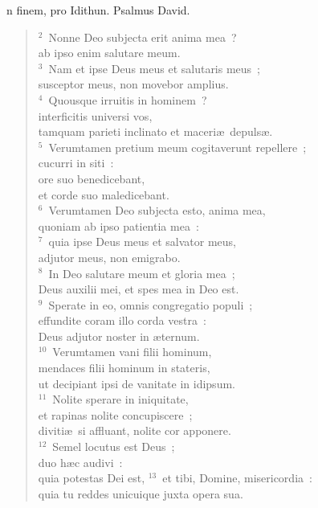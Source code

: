\bchapter
{}n finem, pro Idithun. Psalmus David.
\begin{flushleft}\begin{verse}\vspace{6pt}${}^{2}$~Nonne Deo subjecta erit anima mea~?\\ ab ipso enim salutare meum.\\
${}^{3}$~Nam et ipse Deus meus et salutaris meus~;\\ susceptor meus, non movebor amplius.\\
${}^{4}$~Quousque irruitis in hominem~?\\ interficitis universi vos,\\ tamquam parieti inclinato et maceri\ae\ depuls\ae .\\
${}^{5}$~Verumtamen pretium meum cogitaverunt repellere~;\\ cucurri in siti~:\\ ore suo benedicebant,\\ et corde suo maledicebant.\\
${}^{6}$~Verumtamen Deo subjecta esto, anima mea,\\ quoniam ab ipso patientia mea~:\\
${}^{7}$~quia ipse Deus meus et salvator meus,\\ adjutor meus, non emigrabo.\\
${}^{8}$~In Deo salutare meum et gloria mea~;\\ Deus auxilii mei, et spes mea in Deo est.\\
${}^{9}$~Sperate in eo, omnis congregatio populi~;\\ effundite coram illo corda vestra~:\\ Deus adjutor noster in \ae ternum.\\
${}^{10}$~Verumtamen vani filii hominum,\\ mendaces filii hominum in stateris,\\ ut decipiant ipsi de vanitate in idipsum.\\
${}^{11}$~Nolite sperare in iniquitate,\\ et rapinas nolite concupiscere~;\\ diviti\ae\ si affluant, nolite cor apponere.\\
${}^{12}$~Semel locutus est Deus~;\\ duo h\ae c audivi~:\\ quia potestas Dei est,
${}^{13}$~et tibi, Domine, misericordia~:\\ quia tu reddes unicuique juxta opera sua.\end{verse}\end{flushleft}



